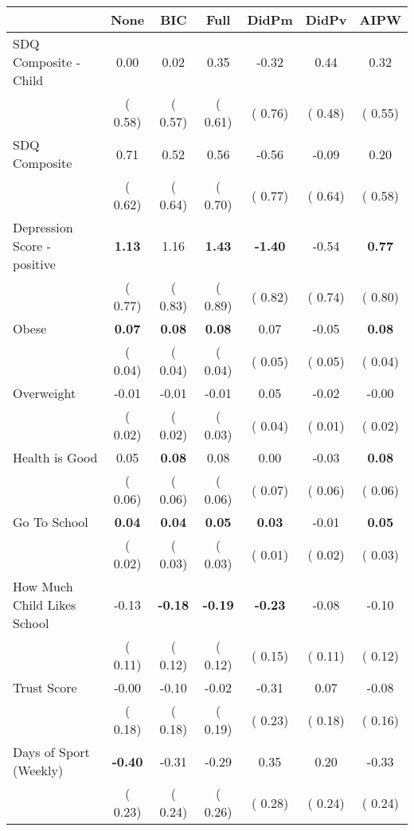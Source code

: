 \begin{tabular}{l c c c c c c}
\toprule
 & None & BIC & Full & DidPm & DidPv & AIPW \\
\midrule
SDQ Composite - Child &      0.00 &      0.02 &      0.35 &     -0.32 &      0.44 &      0.32 \\
& (     0.58) & (     0.57) & (     0.61) & (     0.76) & (     0.48) & (     0.55) \\
SDQ Composite &      0.71 &      0.52 &      0.56 &     -0.56 &     -0.09 &      0.20 \\
& (     0.62) & (     0.64) & (     0.70) & (     0.77) & (     0.64) & (     0.58) \\
Depression Score - positive & \textbf{      1.13 } &      1.16 & \textbf{      1.43 } & \textbf{     -1.40 } &     -0.54 & \textbf{     0.77} \\
& (     0.77) & (     0.83) & (     0.89) & (     0.82) & (     0.74) & (     0.80) \\
Obese & \textbf{      0.07 } & \textbf{      0.08 } & \textbf{      0.08 } &      0.07 &     -0.05 & \textbf{     0.08} \\
& (     0.04) & (     0.04) & (     0.04) & (     0.05) & (     0.05) & (     0.04) \\
Overweight &     -0.01 &     -0.01 &     -0.01 &      0.05 &     -0.02 &     -0.00 \\
& (     0.02) & (     0.02) & (     0.03) & (     0.04) & (     0.01) & (     0.02) \\
Health is Good &      0.05 & \textbf{      0.08 } &      0.08 &      0.00 &     -0.03 & \textbf{     0.08} \\
& (     0.06) & (     0.06) & (     0.06) & (     0.07) & (     0.06) & (     0.06) \\
Go To School & \textbf{      0.04 } & \textbf{      0.04 } & \textbf{      0.05 } & \textbf{      0.03 } &     -0.01 & \textbf{     0.05} \\
& (     0.02) & (     0.03) & (     0.03) & (     0.01) & (     0.02) & (     0.03) \\
How Much Child Likes School &     -0.13 & \textbf{     -0.18 } & \textbf{     -0.19 } & \textbf{     -0.23 } &     -0.08 &     -0.10 \\
& (     0.11) & (     0.12) & (     0.12) & (     0.15) & (     0.11) & (     0.12) \\
Trust Score &     -0.00 &     -0.10 &     -0.02 &     -0.31 &      0.07 &     -0.08 \\
& (     0.18) & (     0.18) & (     0.19) & (     0.23) & (     0.18) & (     0.16) \\
Days of Sport (Weekly) & \textbf{     -0.40 } &     -0.31 &     -0.29 &      0.35 &      0.20 &     -0.33 \\
& (     0.23) & (     0.24) & (     0.26) & (     0.28) & (     0.24) & (     0.24) \\
\bottomrule
\end{tabular}
